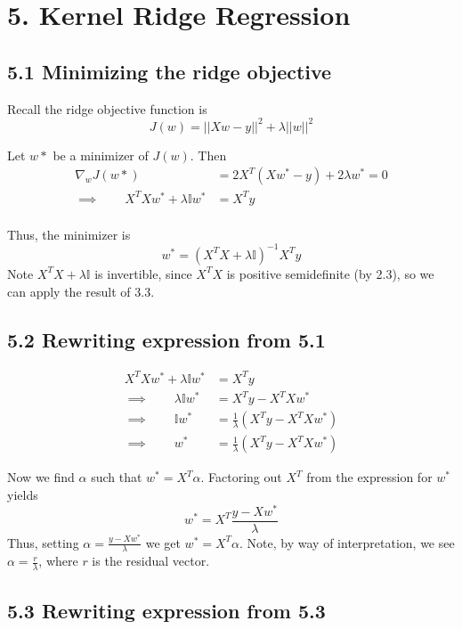 \documentclass[paper=a4, fontsize=11pt]{scrartcl} %
\numberwithin{equation}{section} %
\numberwithin{figure}{section} %
\numberwithin{table}{section} %
\begin{document}

\section*{5. Kernel Ridge Regression}
\subsection*{5.1 Minimizing the ridge objective}

Recall the ridge objective function is
\[J(w) = ||Xw - y||^2 + \lambda||w||^2\]

Let $w*$ be a minimizer of $J(w)$. Then
\begin{align*}
\nabla_w J(w*) &= 2X^T (Xw^*-y) + 2 \lambda w^* = 0 \\
\implies \qquad{} X^TXw^* + \lambda \mathbb{I} w^* &= X^T y\\
\end{align*}

Thus, the minimizer is
\[w^* = (X^TX + \lambda \mathbb{I})^{-1}X^Ty\]
Note $X^TX + \lambda \mathbb{I}$ is invertible, since $X^TX$ is positive semidefinite (by 2.3), so we can apply the result of 3.3.

\subsection*{5.2 Rewriting expression from 5.1}

\begin{align*}
X^TXw^* + \lambda \mathbb{I} w^* &= X^T y \\
\implies \qquad \lambda \mathbb{I} w^* &= X^T y - X^TXw^* \\
\implies \qquad \mathbb{I} w^* &= \frac{1}{\lambda}(X^T y - X^TXw^*) \\
\implies \qquad w^* &= \frac{1}{\lambda}(X^T y - X^TXw^*)
\end{align*}

Now we find $\alpha$ such that $w^* = X^T \alpha$. Factoring out $X^T$ from the expression for $w^*$ yields
\[w^* = X^T \frac{y - Xw^*}{\lambda}\]
Thus, setting $\alpha =  \frac{y - Xw^*}{\lambda}$ we get $w^* = X^T \alpha$. Note, by way of interpretation, we see $\alpha = \frac{r}{\lambda}$, where $r$ is the residual vector.

\subsection*{5.3 Rewriting expression from 5.3}
\end{document}
